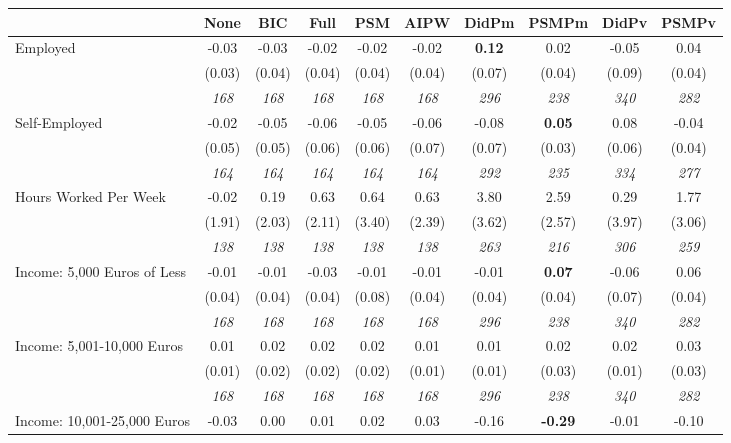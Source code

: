\begin{tabular}{l c c c c c c c c c}
\toprule
 & None & BIC & Full & PSM & AIPW & DidPm & PSMPm & DidPv & PSMPv \\
\midrule
Employed & -0.03 & -0.03 & -0.02 & -0.02 & -0.02 & \textbf{ 0.12 } & 0.02 & -0.05 & 0.04 \\
& (0.03) & (0.04) & (0.04) & (0.04) & (0.04) & (0.07) & (0.04) & (0.09) & (0.04) \\
& \textit{ 168 } & \textit{ 168 } & \textit{ 168 } & \textit{ 168 } & \textit{ 168 } & \textit{ 296 } & \textit{ 238 } & \textit{ 340 } & \textit{ 282 } \\
Self-Employed & -0.02 & -0.05 & -0.06 & -0.05 & -0.06 & -0.08 & \textbf{0.05} & 0.08 & -0.04 \\
& (0.05) & (0.05) & (0.06) & (0.06) & (0.07) & (0.07) & (0.03) & (0.06) & (0.04) \\
& \textit{ 164 } & \textit{ 164 } & \textit{ 164 } & \textit{ 164 } & \textit{ 164 } & \textit{ 292 } & \textit{ 235 } & \textit{ 334 } & \textit{ 277 } \\
Hours Worked Per Week & -0.02 & 0.19 & 0.63 & 0.64 & 0.63 & 3.80 & 2.59 & 0.29 & 1.77 \\
& (1.91) & (2.03) & (2.11) & (3.40) & (2.39) & (3.62) & (2.57) & (3.97) & (3.06) \\
& \textit{ 138 } & \textit{ 138 } & \textit{ 138 } & \textit{ 138 } & \textit{ 138 } & \textit{ 263 } & \textit{ 216 } & \textit{ 306 } & \textit{ 259 } \\
Income: 5,000 Euros of Less & -0.01 & -0.01 & -0.03 & -0.01 & -0.01 & -0.01 & \textbf{0.07} & -0.06 & 0.06 \\
& (0.04) & (0.04) & (0.04) & (0.08) & (0.04) & (0.04) & (0.04) & (0.07) & (0.04) \\
& \textit{ 168 } & \textit{ 168 } & \textit{ 168 } & \textit{ 168 } & \textit{ 168 } & \textit{ 296 } & \textit{ 238 } & \textit{ 340 } & \textit{ 282 } \\
Income: 5,001-10,000 Euros & 0.01 & 0.02 & 0.02 & 0.02 & 0.01 & 0.01 & 0.02 & 0.02 & 0.03 \\
& (0.01) & (0.02) & (0.02) & (0.02) & (0.01) & (0.01) & (0.03) & (0.01) & (0.03) \\
& \textit{ 168 } & \textit{ 168 } & \textit{ 168 } & \textit{ 168 } & \textit{ 168 } & \textit{ 296 } & \textit{ 238 } & \textit{ 340 } & \textit{ 282 } \\
Income: 10,001-25,000 Euros & -0.03 & 0.00 & 0.01 & 0.02 & 0.03 & -0.16 & \textbf{-0.29} & -0.01 & -0.10 \\

\end{tabular}

